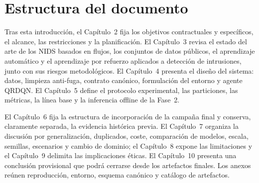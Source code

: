 \section{Estructura del documento}
Tras esta introducción, el Capítulo~2 fija los objetivos contractuales y específicos, el alcance, las restricciones y la planificación. El Capítulo~3 revisa el estado del arte de los NIDS basados en flujos, los conjuntos de datos públicos, el aprendizaje automático y el aprendizaje por refuerzo aplicados a detección de intrusiones, junto con sus riesgos metodológicos. El Capítulo~4 presenta el diseño del sistema: datos, limpieza anti-fuga, contrato canónico, formulación del entorno y agente QRDQN. El Capítulo~5 define el protocolo experimental, las particiones, las métricas, la línea base y la inferencia offline de la Fase~2.

El Capítulo~6 fija la estructura de incorporación de la campaña final y conserva, claramente separada, la evidencia histórica previa. El Capítulo~7 organiza la discusión por generalización, duplicados, coste, comparación de modelos, escala, semillas, escenarios y cambio de dominio; el Capítulo~8 expone las limitaciones y el Capítulo~9 delimita las implicaciones éticas. El Capítulo~10 presenta una conclusión provisional que podrá cerrarse desde los artefactos finales. Los anexos reúnen reproducción, entorno, esquema canónico y catálogo de artefactos.
